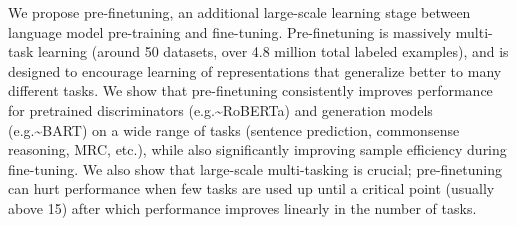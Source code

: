 We propose pre-finetuning, an additional large-scale learning stage between language model pre-training and fine-tuning. Pre-finetuning is massively multi-task learning (around 50 datasets, over 4.8 million total labeled examples), and is designed to encourage learning of representations that generalize better to many different tasks. We show that pre-finetuning consistently improves performance for pretrained discriminators (e.g.{\textasciitilde}RoBERTa) and generation models (e.g.{\textasciitilde}BART) on a wide range of tasks (sentence prediction, commonsense reasoning, MRC, etc.), while also significantly improving sample efficiency during fine-tuning. We also show that large-scale multi-tasking is crucial; pre-finetuning can hurt performance when few tasks are used up until a critical point (usually above 15) after which performance improves linearly in the number of tasks.
